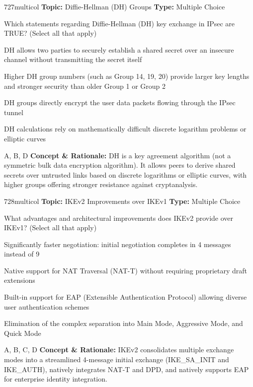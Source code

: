 \begin{qcard}{727}{multicol}
\textcolor{darkslate!75}{\small\textbf{Topic:} Diffie-Hellman (DH) Groups \hfill \textbf{Type:} Multiple Choice}\vspace{0.4em}\par
Which statements regarding Diffie-Hellman (DH) key exchange in IPsec are TRUE? (Select all that apply)
\begin{qoptions}
\item DH allows two parties to securely establish a shared secret over an insecure channel without transmitting the secret itself
\item Higher DH group numbers (such as Group 14, 19, 20) provide larger key lengths and stronger security than older Group 1 or Group 2
\item DH groups directly encrypt the user data packets flowing through the IPsec tunnel
\item DH calculations rely on mathematically difficult discrete logarithm problems or elliptic curves
\end{qoptions}
\end{qcard}
\nopagebreak
\begin{explainbox}{A, B, D}
\textbf{Concept \& Rationale:} DH is a key agreement algorithm (not a symmetric bulk data encryption algorithm). It allows peers to derive shared secrets over untrusted links based on discrete logarithms or elliptic curves, with higher groups offering stronger resistance against cryptanalysis.
\end{explainbox}

\begin{qcard}{728}{multicol}
\textcolor{darkslate!75}{\small\textbf{Topic:} IKEv2 Improvements over IKEv1 \hfill \textbf{Type:} Multiple Choice}\vspace{0.4em}\par
What advantages and architectural improvements does IKEv2 provide over IKEv1? (Select all that apply)
\begin{qoptions}
\item Significantly faster negotiation: initial negotiation completes in 4 messages instead of 9
\item Native support for NAT Traversal (NAT-T) without requiring proprietary draft extensions
\item Built-in support for EAP (Extensible Authentication Protocol) allowing diverse user authentication schemes
\item Elimination of the complex separation into Main Mode, Aggressive Mode, and Quick Mode
\end{qoptions}
\end{qcard}
\nopagebreak
\begin{explainbox}{A, B, C, D}
\textbf{Concept \& Rationale:} IKEv2 consolidates multiple exchange modes into a streamlined 4-message initial exchange (IKE\_SA\_INIT and IKE\_AUTH), natively integrates NAT-T and DPD, and natively supports EAP for enterprise identity integration.
\end{explainbox}

